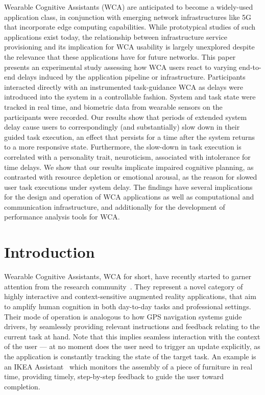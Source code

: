 \documentclass[10pt,letterpaper]{article}
\begin{document}
Wearable Cognitive Assistants (WCA) are anticipated to become a widely-used application class, in conjunction with emerging network infrastructures like 5G that incorporate edge computing capabilities.
While prototypical studies of such applications exist today, the relationship between infrastructure service provisioning and its implication for WCA usability is largely unexplored despite the relevance that these applications have for future networks.
This paper presents an experimental study assessing how WCA users react to varying end-to-end delays induced by the application pipeline or infrastructure.
Participants interacted directly with an instrumented task-guidance WCA as delays were introduced into the system in a controllable fashion.
System and task state were tracked in real time, and biometric data from wearable sensors on the participants were recorded.
Our results show that periods of extended system delay cause users to correspondingly (and substantially) slow down in their guided task execution, an effect that persists for a time after the system returns to a more responsive state.
Furthermore, the slow-down in task execution is correlated with a personality trait, neuroticism, associated with intolerance for time delays.
We show that our results implicate impaired cognitive planning, as contrasted with resource depletion or emotional arousal, as the reason for slowed user task executions under system delay.
The findings have several implications for the design and operation of WCA applications as well as computational and communication infrastructure, and additionally for the development of performance analysis tools for WCA.\@


\linenumbers%
\section{Introduction}

Wearable Cognitive Assistants, WCA for short, have recently started to garner attention from the research community~\cite{Ha:TowardsWearableCogAssist,Chen:EarlyImplementation}.
They represent a novel category of highly interactive and context-sensitive augmented reality applications, that aim to amplify human cognition in both day-to-day tasks and professional settings.
Their mode of operation is analogous to how GPS navigation systems guide drivers, by seamlessly providing relevant instructions and feedback relating to the current task at hand.
Note that this implies seamless interaction with the context of the user --- at no moment does the user need to trigger an update explicitly, as the application is constantly tracking the state of the target task.
An example is an IKEA Assistant~\cite{IKEAAssistant} which monitors the assembly of a piece of furniture in real time, providing timely, step-by-step feedback to guide the user toward completion.
\end{document}
